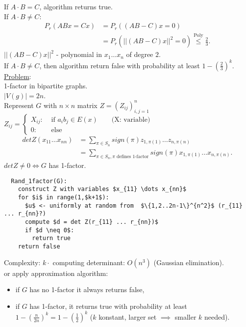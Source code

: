 \documentclass[a4paper, 12pt]{book}
\theoremstyle{definition}
\theoremstyle{remark}
\begin{document}
If $A \cdot B = C$, algorithm returns true. \\
If $A \cdot B \neq C$: \\
\begin{align*}
  P_r(ABx = Cx) &= P_r((AB-C)x = 0) \\
  &= P_r\left(||(AB-C)x||^2 = 0\right) \stackrel{\text{Poly}}{\leq} \frac{2}{3}.
\end{align*}
$||(AB-C)x||^2$ - polynomial in $x_1 \dots x_n$ of degree $2$. \\
If $A \cdot B \neq C$, then algorithm return false with probability at least $1 - \left(\frac{2}{3}\right)^k$. \\
\underline{Problem}: \\
1-factor in bipartite graphs. \\
$|V(g)| = 2n$. \\
Represent $G$ with $n \times n$ matrix $Z = (Z_{ij})_{i,j=1}^n$ \\
$Z_{ij} = \begin{cases}
  X_{ij}: &\text{ if } a_i b_j \in E(x) \qquad \text{(X: variable)} \\
  0: &\text{ else}
\end{cases}$ \\
\begin{align*}
  det Z(x_{11} \dots x_{nn}) &= \sum_{\pi \in S_n} sign(\pi) z_{1,\pi(1)} \dots z_{n,\pi(n)} \\
  &= \sum_{\pi \in S_n, \pi \text{ defines 1-factor}} sign(\pi) x_{1,\pi(1)} \dots x_{n,\pi(n)}.
\end{align*}
$det Z \neq 0 \iff G$ has 1-factor.
\begin{lstlisting}
  Rand_1factor(G):
    construct Z with variables $x_{11} \dots x_{nn}$
    for $i$ in range(1,$k+1$):
      $u$ <- uniformly at random from  $\{1,2..2n-1\}^{n^2}$ (r_{11} ... r_{nn}?)
      compute $d = det Z(r_{11} ... r_{nn})$
      if $d \neq 0$:
        return true
    return false
\end{lstlisting}
Complexity: $k \cdot$ computing determinant: $O\left(n^3\right)$ (Gaussian elimination). \\
or apply approximation algorithm:
\begin{itemize}
  \item if $G$ has no 1-factor it always returns false,
  \item if $G$ has 1-factor, it returns true with probability at least \\
    $1-\left(\frac{n}{2n}\right)^k = 1 - \left(\frac{1}{2}\right)^k$
    ($k$ konstant, larger set $\implies$ smaller $k$ needed).
\end{itemize}
\end{document}
